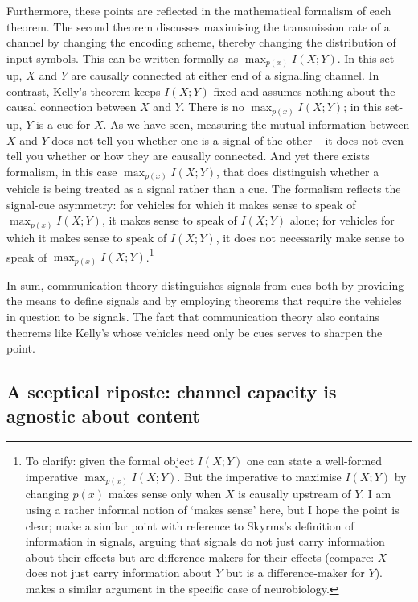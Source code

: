 Furthermore, these points are reflected in the mathematical formalism of each theorem.
The second theorem discusses maximising the transmission rate of a channel by changing the encoding scheme, thereby changing the distribution of input symbols.
This can be written formally as $\max_{p(x)}I(X;Y)$.
In this set-up, $X$ and $Y$ are causally connected at either end of a signalling channel.
In contrast, Kelly's theorem keeps $I(X;Y)$ fixed and assumes nothing about the causal connection between $X$ and $Y$.
There is no $\max_{p(x)}I(X;Y)$; in this set-up, $Y$ is a cue for $X$.
As we have seen, measuring the mutual information between $X$ and $Y$ does not tell you whether one is a signal of the other -- it does not even tell you whether or how they are causally connected.
And yet there exists formalism, in this case $\max_{p(x)}I(X;Y)$, that does distinguish whether a vehicle is being treated as a signal rather than a cue.
The formalism reflects the signal-cue asymmetry: for vehicles for which it makes sense to speak of $\max_{p(x)}I(X;Y)$, it makes sense to speak of $I(X;Y)$ alone; for vehicles for which it makes sense to speak of $I(X;Y)$, it does not necessarily make sense to speak of $\max_{p(x)}I(X;Y)$.\footnote{To clarify: given the formal object $I(X;Y)$ one can state a well-formed imperative $\max_{p(x)}I(X;Y)$. But the imperative to maximise $I(X;Y)$ by changing $p(x)$ makes sense only when $X$ is causally upstream of $Y$. I am using a rather informal notion of `makes sense' here, but I hope the point is clear; \citet{calcott2020signals} make a similar point with reference to Skyrms's \citeyearpar{skyrms2010signals} definition of information in signals, arguing that signals do not just carry information about their effects but are difference-makers for their effects (compare: $X$ does not just carry information about $Y$ but is a difference-maker for $Y$). 
\citet{rathkopf2017neural} makes a similar argument in the specific case of neurobiology.}

In sum, communication theory distinguishes signals from cues both by providing the means to define signals and by employing theorems that require the vehicles in question to be signals.
The fact that communication theory also contains theorems like Kelly's whose vehicles need only be cues serves to sharpen the point.

\subsection{A sceptical riposte: channel capacity is agnostic about content}

